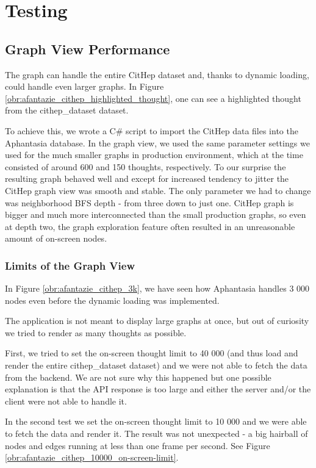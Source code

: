 \chapter{Testing}
\label{chap:testing}

\section{Graph View Performance}

The graph can handle the entire CitHep dataset and, thanks to dynamic loading, could handle even larger graphs.
In Figure \ref{obr:afantazie_cithep_highlighted_thought}, one can see a highlighted thought from the \gls{cithep_dataset} dataset.

To achieve this, we wrote a C\# script to import the CitHep data files into the Aphantasia database.
In the graph view, we used the same parameter settings we used for the much smaller graphs in \gls{production} environment, which at the time consisted of around 600 and 150 thoughts, respectively.
To our surprise the resulting graph behaved well and except for increased tendency to jitter the CitHep graph view was smooth and stable.
The only parameter we had to change was neighborhood \gls{BFS} depth - from three down to just one.
CitHep graph is bigger and much more interconnected than the small production graphs, so even at depth two, the graph exploration feature often resulted in an unreasonable amount of on-screen nodes.

\subsection{Limits of the Graph View}

In Figure \ref{obr:afantazie_cithep_3k}, we have seen how Aphantasia handles 3 000 nodes
even before the dynamic loading was implemented. 

The application is not meant to display large graphs at once, but out of curiosity we tried to render as many thoughts as possible.

First, we tried to set the on-screen thought limit to 40 000
(and thus load and render the entire \gls{cithep_dataset} dataset) and we were not able to fetch the data from the backend.
We are not sure why this happened but one possible explanation is that the API response is too large and either the server and/or the client were not able to handle it.

In the second test we set the on-screen thought limit to 10 000 and we were able to fetch the data and render it.
The result was not unexpected - a big hairball of nodes and edges running at less than one frame per second.
See Figure \ref{obr:afantazie_cithep_10000_on-screen-limit}.


